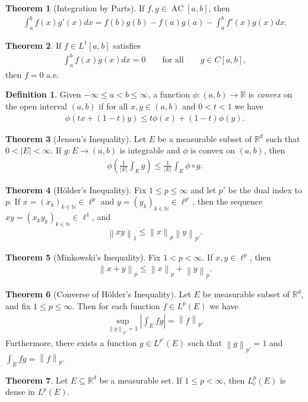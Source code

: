 \documentclass[a4paper,9pt]{extarticle}
\newcommand{\norm}[1]{\left\lVert#1\right\rVert}
\DeclareMathOperator*{\AC}{AC}
\theoremstyle{definition}
\newtheorem{defin}{Definition}
\newtheorem{thm}{Theorem}
\begin{document}
\begin{thm}[Integration by Parts]
    If $f, g \in \AC[a, b]$, then
    \begin{align*}
        \int_a^b f(x) g'(x) dx = f(b)g(b) - f(a)g(a) - \int_a^b f'(x)g(x)dx.
    \end{align*}
\end{thm}
\begin{thm}
    If $f \in L^1[a, b]$ satisfies
    \begin{align*}
        \int_a^b f(x)g(x)dx = 0 \qquad \text{for all} \qquad g \in C[a, b],
    \end{align*}
    then $f = 0$ a.e.
\end{thm}
\begin{defin}
    Given $-\infty \leq a < b \leq \infty$, a function $\phi : (a, b) \to \mathbb{R}$ is \emph{convex} on the open interval $(a, b)$ if for all $x, y \in (a, b)$ and $0 < t < 1$ we have
    \begin{align*}
        \phi(tx + (1 - t)y) \leq t\phi(x) + (1 - t)\phi(y).
    \end{align*}
\end{defin}
\begin{thm}[Jensen's Inequality]
    Let $E$ be a measurable subset of $\mathbb{R}^d$ such that $0 < |E| < \infty$. If $g : E \to (a, b)$ is integrable and $\phi$ is convex on $(a, b)$, then
    \begin{align*}
        \phi\left( \frac{1}{|E|} \int_E g \right) \leq \frac{1}{|E|} \int_E \phi \circ g.
    \end{align*}
\end{thm}
\begin{thm}[H\"older's Inequality]
    Fix $1 \leq p \leq \infty$ and let $p'$ be the dual index to $p$. If $x = (x_k)_{k \in \mathbb{N}} \in \ell^p$ and $y = (y_k)_{k \in \mathbb{N}} \in \ell^{p'}$, then the sequence $xy = (x_k y_k)_{k \in \mathbb{N}} \in \ell^1$, and
    \begin{align*}
        \norm{xy}_1 \leq \norm{x}_p \norm{y}_{p'}.
    \end{align*}
\end{thm}
\begin{thm}[Minkowski's Inequality]
    Fix $1 < p < \infty$. If $x, y \in \ell^p$, then
    \begin{align*}
        \norm{x + y}_p \leq \norm{x}_p + \norm{y}_p.
    \end{align*}
\end{thm}
\begin{thm}[Converse of H\"older's Inequality]
    Let $E$ be measurable subset of $\mathbb{R}^d$, and fix $1 \leq p \leq \infty$. Then for each function $f \in L^p(E)$ we have
    \begin{align*}
        \sup_{\norm{g}_{p'} = 1} \left| \int_E fg \right| = \norm{f}_p.
    \end{align*}
    Furthermore, there exists a function $g \in L^{p'}(E)$ such that $\norm{g}_{p'} = 1$ and $\int_E fg = \norm{f}_p$.
\end{thm}
\begin{thm}
    Let $E \subseteq \mathbb{R}^d$ be a measurable set. If $1 \leq p < \infty$, then $L_c^p(E)$ is dense in $L^p(E)$.
\end{thm}
\end{document}
